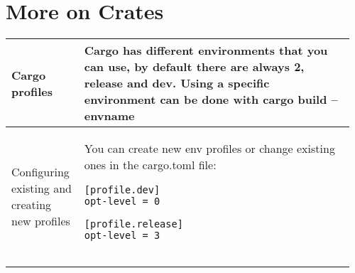 \documentclass[main.tex,fontsize=8pt,paper=a4,paper=portrait,DIV=calc,]{scrartcl}
\begin{document}
\pagebreak
\begin{table}[ht!]
\section{More on Crates}
\begin{tabular}{|m{0.2\linewidth}|m{0.755\linewidth}|}
\hline
Cargo profiles & 
Cargo has different environments that you can use, by default there are always 2, \textbf{release} and \textbf{dev}.\newline
\textcolor{OliveGreen}{Using a specific environment can be done with cargo build --envname}\newline

\\
\hline
Configuring existing and creating new profiles & 
You can create new env profiles or change existing ones in the cargo.toml file: \newline
\begin{lstlisting}
[profile.dev]
opt-level = 0

[profile.release]
opt-level = 3


\end{lstlisting}
\end{tabular}
\end{table}
\end{document}
